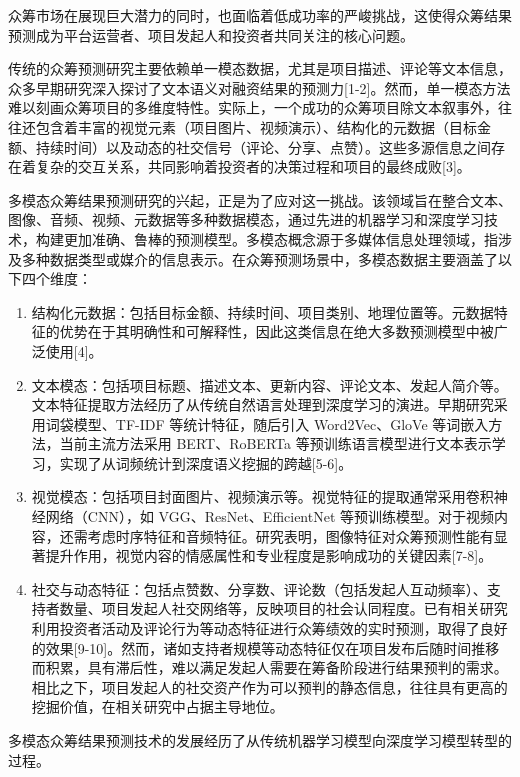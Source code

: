 众筹市场在展现巨大潜力的同时，也面临着低成功率的严峻挑战，这使得众筹结果预测成为平台运营者、项目发起人和投资者共同关注的核心问题。

传统的众筹预测研究主要依赖单一模态数据，尤其是项目描述、评论等文本信息，众多早期研究深入探讨了文本语义对融资结果的预测力[1-2]。然而，单一模态方法难以刻画众筹项目的多维度特性。实际上，一个成功的众筹项目除文本叙事外，往往还包含着丰富的视觉元素（项目图片、视频演示）、结构化的元数据（目标金额、持续时间）以及动态的社交信号（评论、分享、点赞）。这些多源信息之间存在着复杂的交互关系，共同影响着投资者的决策过程和项目的最终成败[3]。

多模态众筹结果预测研究的兴起，正是为了应对这一挑战。该领域旨在整合文本、图像、音频、视频、元数据等多种数据模态，通过先进的机器学习和深度学习技术，构建更加准确、鲁棒的预测模型。多模态概念源于多媒体信息处理领域，指涉及多种数据类型或媒介的信息表示。在众筹预测场景中，多模态数据主要涵盖了以下四个维度：

\begin{enumerate}
\def\labelenumi{(\arabic{enumi})}
\item
  结构化元数据：包括目标金额、持续时间、项目类别、地理位置等。元数据特征的优势在于其明确性和可解释性，因此这类信息在绝大多数预测模型中被广泛使用[4]。
\item
  文本模态：包括项目标题、描述文本、更新内容、评论文本、发起人简介等。文本特征提取方法经历了从传统自然语言处理到深度学习的演进。早期研究采用词袋模型、TF-IDF 等统计特征，随后引入 Word2Vec、GloVe 等词嵌入方法，当前主流方法采用 BERT、RoBERTa 等预训练语言模型进行文本表示学习，实现了从词频统计到深度语义挖掘的跨越[5-6]。
\item
  视觉模态：包括项目封面图片、视频演示等。视觉特征的提取通常采用卷积神经网络（CNN），如 VGG、ResNet、EfficientNet 等预训练模型。对于视频内容，还需考虑时序特征和音频特征。研究表明，图像特征对众筹预测性能有显著提升作用，视觉内容的情感属性和专业程度是影响成功的关键因素[7-8]。
\item
  社交与动态特征：包括点赞数、分享数、评论数（包括发起人互动频率）、支持者数量、项目发起人社交网络等，反映项目的社会认同程度。已有相关研究利用投资者活动及评论行为等动态特征进行众筹绩效的实时预测，取得了良好的效果[9-10]。然而，诸如支持者规模等动态特征仅在项目发布后随时间推移而积累，具有滞后性，难以满足发起人需要在筹备阶段进行结果预判的需求。相比之下，项目发起人的社交资产作为可以预判的静态信息，往往具有更高的挖掘价值，在相关研究中占据主导地位。
\end{enumerate}

多模态众筹结果预测技术的发展经历了从传统机器学习模型向深度学习模型转型的过程。

